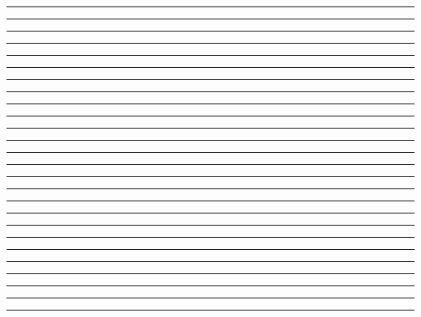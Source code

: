 \documentclass{article}
\begin{document}
\newpage
\noindent{}\rule{1cm}{0.025cm}\framebox{\rule{1cm}{1cm}}

\newpage
\noindent{}\rule{1cm}{0.025cm}

\newpage
\noindent{}\rule{1cm}{0.025cm}

\newpage
\noindent{}\rule{1cm}{0.025cm}

\newpage
\noindent{}\rule{1cm}{0.025cm}

\newpage
\noindent{}\rule{1cm}{0.025cm}

\newpage
\noindent{}\rule{1cm}{0.025cm}

\newpage
\noindent{}\rule{1cm}{0.025cm}

\newpage
\noindent{}\rule{1cm}{0.025cm}

\newpage
\noindent{}\rule{1cm}{0.025cm}

\newpage
\noindent{}\rule{1cm}{0.025cm}

\newpage
\noindent{}\rule{1cm}{0.025cm}

\newpage
\noindent{}\rule{1cm}{0.025cm}

\newpage
\noindent{}\rule{1cm}{0.025cm}

\newpage
\noindent{}\rule{1cm}{0.025cm}

\newpage
\noindent{}\rule{1cm}{0.025cm}

\newpage
\noindent{}\rule{1cm}{0.025cm}

\newpage
\noindent{}\rule{1cm}{0.025cm}

\newpage
\noindent{}\rule{1cm}{0.025cm}

\newpage
\noindent{}\rule{1cm}{0.025cm}

\newpage
\noindent{}\rule{1cm}{0.025cm}

\newpage
\noindent{}\rule{1cm}{0.025cm}

\newpage
\noindent{}\rule{1cm}{0.025cm}

\newpage
\noindent{}\rule{1cm}{0.025cm}

\newpage
\noindent{}\rule{1cm}{0.025cm}

\newpage
\noindent{}\rule{1cm}{0.025cm}
\end{document}

